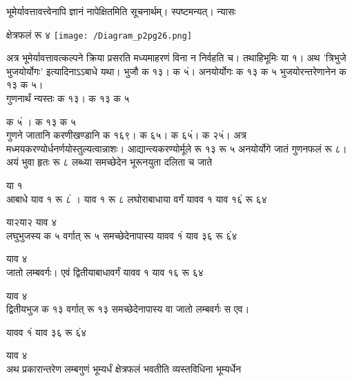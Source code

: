 \documentclass[11pt, openany]{book}
\begin{document}
\begin{sloppypar}
\hangindent=0.2in भूमेर्यावत्तावत्त्वेनापि ज्ञानं नापेक्षितमिति सूचनार्थम्। स्पष्टमन्यत्। न्यासः

\begin{center}
क्षेत्रफलं रू ४  \texttt{[image: /Diagram\_p2pg26.png]}
\end{center}

\hangindent=0.2in \hspace{0.2in}अत्र भूमेर्यावत्तावत्कल्पने क्रिया प्रसरति मध्यमाहरणं विना न निर्वहति च। तथाहि\textendash भूमिः या १। अथ 'त्रिभुजे भुजयोर्योगः' इत्यादिनाऽऽबाधे यथा। भुजौ क १३। क ५ं। अनयोर्योगः क १३ क ५ भुजयोरन्तरेणानेन क १३ क ५।\\

\hangindent=0.2in \hspace{0.2in}गुणनार्थं न्यस्तः क १३। क १३ क ५

\hspace{1.25in}क ५ं । क १३ क ५\\

\hangindent=0.2in \hspace{0.2in}गुणने जातानि करणीखण्डानि क १६९। क ६५। क ६५ं। क २५ं। अत्र मध्मयकरण्योर्धनर्णयोस्तुल्यत्वान्नाशः। आद्यान्त्यकरण्योर्मूले रू १३ रू ५ अनयोर्योगे जातं गुणनफलं रू ८। अयं भुवा हृतः रू ८ लब्ध्या समच्छेदेन भूरूनयुता दलिता च जाते

\hspace{0.6in}या १\\

\hangindent=0.2in आबाधे याव १ रू ८ं । याव १ रू ८ लघोराबाधाया वर्गं यावव १ याव १६ं रू ६४

\hspace{0.5in}या\hspace{0.2in}२\hspace{0.55in}या\hspace{0.2in}२ \hspace{2.05in}याव ४\\

\hangindent=0.2in लघुभुजस्य क ५ वर्गात् रू ५ समच्छेदेनापास्य यावव १ं याव ३६ रू ६ं४

\hspace{3.5in}याव ४\\

\hangindent=0.2in जातो लम्बवर्गः। एवं द्वितीयाबाधावर्गं यावव १ याव १६ रू ६४

\hspace{3in}याव ४\\

\hangindent=0.2in द्वितीयभुज क १३ वर्गात् रू १३ समच्छेदेनापास्य वा जातो लम्बवर्गः स एव।

\hspace{1in}यावव १ं याव ३६ रू ६ं४

\hspace{1in}याव\hspace{0.15in} ४\\

\hangindent=0.2in अथ प्रकारान्तरेण लम्बगुणं भूम्यर्धं क्षेत्रफलं भवतीति व्यस्तविधिना भूम्यर्धेन
\end{sloppypar}
\thispagestyle{empty}
\newpage
\end{document}
